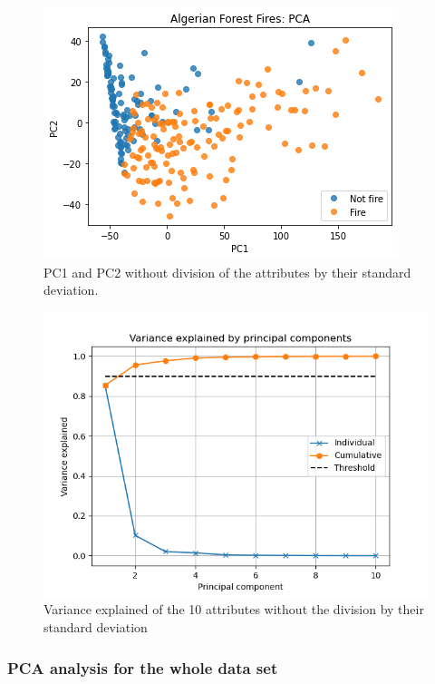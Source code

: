\documentclass[10pt]{article}
\numberwithin{equation}{section}
\numberwithin{figure}{section}
\numberwithin{table}{section}
\begin{document}
\begin{figure} [H]
    \centering
    \includegraphics[scale=0.5]{Figures/PC1VsPC2_withoutStandardizing.png}
    \caption{PC1 and PC2 without division of the attributes by their standard deviation.}
    \label{fig:PC1PC2WithoutStd}
\end{figure}

\begin{figure} [H]
    \centering
    \includegraphics[scale=0.5]{Figures/variance_explained_no_standardization.png}
    \caption{Variance explained of the 10 attributes without the division by their standard deviation}
    \label{fig:VarexplainedWithoutStd}
\end{figure}

\subsubsection{PCA analysis for the whole data set}
\end{document}

